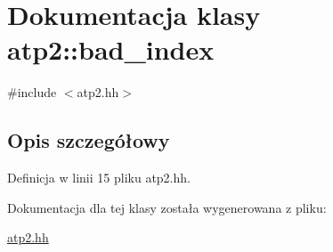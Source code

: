 \hypertarget{classatp2_1_1bad__index}{}\section{Dokumentacja klasy atp2\+:\+:bad\+\_\+index}
\label{classatp2_1_1bad__index}


{\ttfamily \#include $<$atp2.\+hh$>$}



\subsection{Opis szczegółowy}


Definicja w linii 15 pliku atp2.\+hh.



Dokumentacja dla tej klasy została wygenerowana z pliku\+:\begin{DoxyCompactItemize}
\item 
\hyperlink{atp2_8hh}{atp2.\+hh}\end{DoxyCompactItemize}
